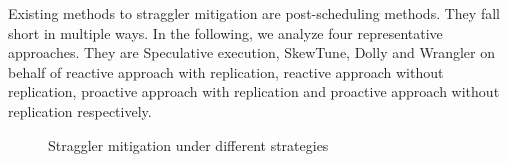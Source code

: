   Existing methods to straggler mitigation are post-scheduling methods. They fall short in multiple ways. In the following, we analyze four representative approaches. They are Speculative execution, SkewTune, Dolly and Wrangler on behalf of reactive approach with replication, reactive approach without replication, proactive approach with replication and proactive approach without replication respectively.
  \begin{figure}[htbp]
    \centering
    \hfill
    \hfill
    \caption{Straggler mitigation under different strategies}
    \label{Fig. 3:}
  \end{figure}

